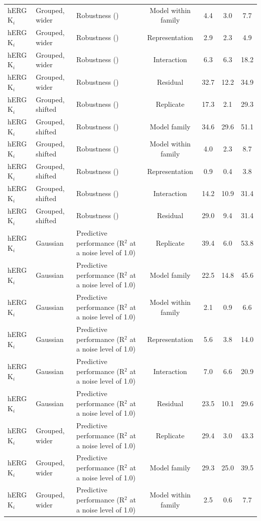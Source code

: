 \begin{landscape}
{\begin{longtable}{lllcccc}
hERG K$_i$ & Grouped, wider & Robustness (\aucnorm{}) & Model within family & 4.4 & 3.0 & 7.7 \\
hERG K$_i$ & Grouped, wider & Robustness (\aucnorm{}) & Representation & 2.9 & 2.3 & 4.9 \\
hERG K$_i$ & Grouped, wider & Robustness (\aucnorm{}) & Interaction & 6.3 & 6.3 & 18.2 \\
hERG K$_i$ & Grouped, wider & Robustness (\aucnorm{}) & Residual & 32.7 & 12.2 & 34.9 \\
hERG K$_i$ & Grouped, shifted & Robustness (\aucnorm{}) & Replicate & 17.3 & 2.1 & 29.3 \\
hERG K$_i$ & Grouped, shifted & Robustness (\aucnorm{}) & Model family & 34.6 & 29.6 & 51.1 \\
hERG K$_i$ & Grouped, shifted & Robustness (\aucnorm{}) & Model within family & 4.0 & 2.3 & 8.7 \\
hERG K$_i$ & Grouped, shifted & Robustness (\aucnorm{}) & Representation & 0.9 & 0.4 & 3.8 \\
hERG K$_i$ & Grouped, shifted & Robustness (\aucnorm{}) & Interaction & 14.2 & 10.9 & 31.4 \\
hERG K$_i$ & Grouped, shifted & Robustness (\aucnorm{}) & Residual & 29.0 & 9.4 & 31.4 \\
hERG K$_i$ & Gaussian & Predictive performance (R$^2$ at a noise level of 1.0) & Replicate & 39.4 & 6.0 & 53.8 \\
hERG K$_i$ & Gaussian & Predictive performance (R$^2$ at a noise level of 1.0) & Model family & 22.5 & 14.8 & 45.6 \\
hERG K$_i$ & Gaussian & Predictive performance (R$^2$ at a noise level of 1.0) & Model within family & 2.1 & 0.9 & 6.6 \\
hERG K$_i$ & Gaussian & Predictive performance (R$^2$ at a noise level of 1.0) & Representation & 5.6 & 3.8 & 14.0 \\
hERG K$_i$ & Gaussian & Predictive performance (R$^2$ at a noise level of 1.0) & Interaction & 7.0 & 6.6 & 20.9 \\
hERG K$_i$ & Gaussian & Predictive performance (R$^2$ at a noise level of 1.0) & Residual & 23.5 & 10.1 & 29.6 \\
hERG K$_i$ & Grouped, wider & Predictive performance (R$^2$ at a noise level of 1.0) & Replicate & 29.4 & 3.0 & 43.3 \\
hERG K$_i$ & Grouped, wider & Predictive performance (R$^2$ at a noise level of 1.0) & Model family & 29.3 & 25.0 & 39.5 \\
hERG K$_i$ & Grouped, wider & Predictive performance (R$^2$ at a noise level of 1.0) & Model within family & 2.5 & 0.6 & 7.7 \\

\end{longtable}}
\end{landscape}
